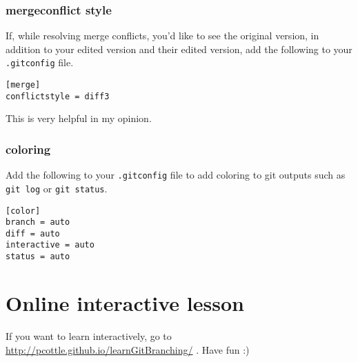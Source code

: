 \documentclass[12pt]{article}
\begin{document}
\subsubsection{mergeconflict style}
If, while resolving merge conflicts, you'd like to see the original version, in addition to your edited version and their edited version, add the following to your \texttt{.gitconfig} file.

\texttt{[merge]\\
conflictstyle = diff3 }

This is very helpful in my opinion.

\subsubsection{coloring}
Add the following to your \texttt{.gitconfig} file to add coloring to git outputs such as \texttt{git log} or \texttt{git status}.

\texttt{[color]\\
  branch = auto\\
  diff = auto\\
  interactive = auto\\
  status = auto }

\section{Online interactive lesson}
If you want to learn interactively, go to \url{http://pcottle.github.io/learnGitBranching/} . Have fun :)
\end{document}
